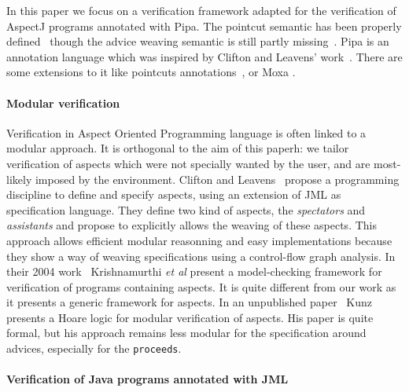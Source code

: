 In this paper we focus on a verification framework adapted for the
verification of AspectJ programs annotated with Pipa.  The pointcut
semantic has been properly
defined~\cite{DBLP:conf/popl/AvgustinovHOMSTV07} though the advice
weaving semantic is still partly missing~\cite{weaving06}.  Pipa is an
annotation language which was inspired by Clifton and Leavens'
work~\cite{clifton02observers}. There are some extensions to it like
pointcuts annotations~\cite{pointcuts07}, or Moxa \cite{moxa05}.


\paragraph{Modular verification}
Verification in Aspect Oriented Programming language is often linked
to a modular approach.  It is orthogonal to the aim of this paperh: we
tailor verification of aspects which were not specially wanted by the
user, and are most-likely imposed by the environment.  Clifton and
Leavens~\cite{clifton02observers,clifton02spectators,cliftonPhd}
propose a programming discipline to define and specify aspects, using
an extension of JML as specification language.  They define two kind
of aspects, the \emph{spectators} and \emph{assistants} and propose to
explicitly allows the weaving of these aspects. This approach allows
efficient modular reasonning and easy implementations because they
show a way of weaving specifications using a control-flow graph
analysis. In their 2004 work~\cite{shriram04} Krishnamurthi {\it et
al} present a model-checking framework for verification of programs
containing aspects. It is quite different from our work as it presents
a generic framework for aspects. In an unpublished paper~\cite{cesar}
Kunz presents a Hoare logic for modular verification of aspects. His
paper is quite formal, but his approach remains less modular for the
specification around advices, especially for the {\tt proceeds}.

\paragraph{Verification of Java programs annotated with JML}
 








